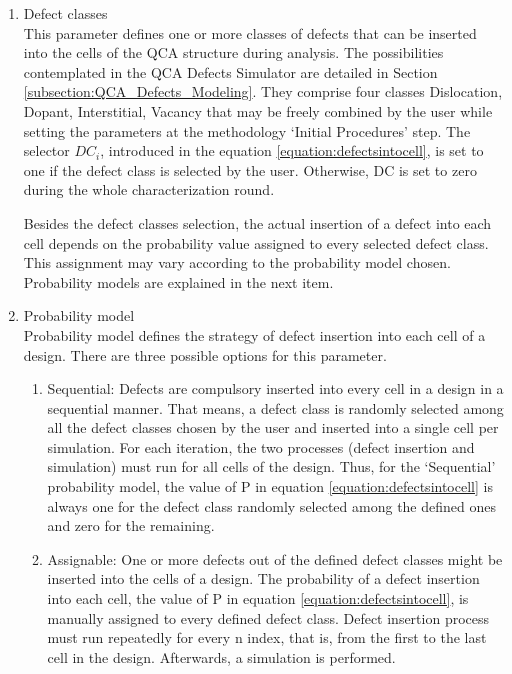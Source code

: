 \begin{enumerate}
\begin{enumerate}
\item Defect classes \\
\label{item_defect_classes}
This parameter defines one or more classes of defects that can be inserted into the cells of the QCA structure during analysis. The possibilities contemplated in the QCA Defects Simulator are detailed in Section \ref{subsection:QCA_Defects_Modeling}. They comprise four classes \textemdash Dislocation, Dopant, Interstitial, Vacancy \textemdash that may be freely combined by the user while setting the parameters at the methodology `Initial Procedures' step. The selector $DC_i$, introduced in the equation \ref{equation:defectsintocell}, is set to one if the defect class is selected by the user. Otherwise, DC is set to zero during the whole characterization round.

Besides the defect classes selection, the actual insertion of a defect into each cell depends on the probability value assigned to every selected defect class. This assignment may vary according to the probability model chosen. Probability models are explained in the next item.

\item Probability model \\
\label{item_prob_model}
Probability model defines the strategy of defect insertion into each cell of a design. There are three possible options for this parameter.

\begin{enumerate}
    \item Sequential: Defects are compulsory inserted into every cell in a design in a sequential manner. That means, a defect class is randomly selected among all the defect classes chosen by the user and inserted into a single cell per simulation. For each iteration, the two processes (defect insertion and simulation) must run for all cells of the design. Thus, for the `Sequential' probability model, the value of P in equation \ref{equation:defectsintocell} is always one for the defect class randomly selected among the defined ones and zero for the remaining.
    
    \item Assignable: One or more defects out of the defined defect classes might be inserted into the cells of a design. The probability of a defect insertion into each cell, the value of P in equation \ref{equation:defectsintocell}, is manually assigned to every defined defect class. Defect insertion process must run repeatedly for every n index, that is, from the first to the last cell in the design. Afterwards, a simulation is performed.
    

\end{enumerate}
\end{enumerate}
\end{enumerate}
